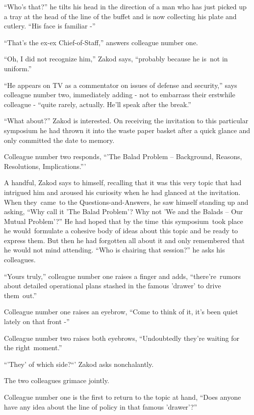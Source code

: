 \documentclass[twoside,11pt]{book}
\begin{document}
``Who's that?'' he tilts his head in the direction of a man who has just picked up a tray at
the head of the line of the buffet and is now collecting his plate and cutlery. ``His face is familiar
-'' 

``That's the ex-ex Chief-of-Staff,'' answers colleague number one. 

``Oh, I did not recognize him,'' Zakod says, ``probably because he is~not in
uniform.'' ~

``He appears on TV as a commentator on issues of defense and security,'' says colleague number
two, immediately adding - not to embarrass their erstwhile colleague - ``quite rarely, actually. He'll
speak after the break.'' 

``What about?'' Zakod is interested. On receiving the invitation to this particular symposium
he had thrown it into the waste paper basket after a quick glance and only committed the date to memory. 

Colleague number two responds, ``'The Balad Problem -- Background, Reasons, Resolutions,
Implications.{}''' 

A handful, Zakod says to himself, recalling that it was this very topic that had intrigued him and aroused his curiosity
when he had glanced at the invitation. When they{\ }came{\ }to
the Questions-and-Answers{, }he saw himself standing up and asking, ``Why call it 'The
Balad Problem'? Why not 'We and the Balads -- Our Mutual Problem'?'' He had hoped that by the time~this
symposium{\ }took place he would~formulate a cohesive body of ideas about this topic and be ready to
express them. But then he had forgotten all about it and only remembered that he would not mind attending.
``Who is chairing that session?'' he asks his colleagues. 

``Yours truly,'' colleague number one raises a finger and adds, ``there're~rumors
about detailed operational plans stashed in the famous 'drawer{}' to drive them\ out.''

Colleague number one raises an eyebrow, ``Come to think of it, it's been quiet lately on that front
-'' 

Colleague number two raises both eyebrows, ``Undoubtedly they're waiting for the
right~moment.'' 

``'They' of which side?``{}' Zakod asks nonchalantly.

The two colleagues grimace jointly. 

Colleague number one is the first to return to the topic at hand, ``Does anyone have any idea about the
line of policy in that famous {}'drawer{}'?'' 
\end{document}
